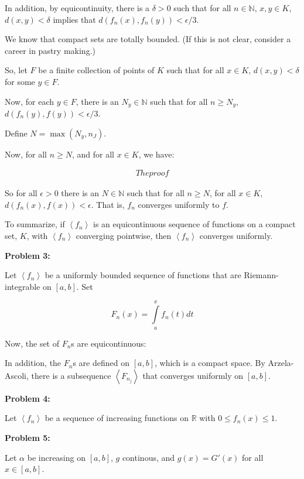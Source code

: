\documentclass[a4paper,12pt]{article}
\newcommand{\tab}{\hspace{4mm}} %
\newcommand{\shunt}{\vspace{20mm}}
\newcommand{\anbrack}[1]{\left\langle #1 \right\rangle}
\newcommand{\al}{\alpha} %
\newcommand{\de}{\delta}
\newcommand{\ep}{\epsilon}
\newcommand{\N}{\mathbb{N}}
\newcommand{\R}{\mathbb{R}}
\begin{document}
\tab In addition, by equicontinuity, there is a $\de >0$ such that for all $n \in \N$, $x,y \in K$, $d(x,y) < \de$ implies that $d(f_n(x),f_n(y)) < \ep/3$.

\tab We know that compact sets are totally bounded. (If this is not clear, consider a career in pastry making.)

\tab So, let $F$ be a finite collection of points of $K$ such that for all $x \in K$, $d(x,y) < \de$ for some $y \in F$.

\tab Now, for each $y \in F$, there is an $N_y \in \N$ such that for all $n \geq N_y$, $d(f_n(y),f(y)) < \ep/3$. 

\tab Define $N = \max(N_y,n_J)$. 

\tab Now, for all $n \geq N$, and for all $x \in K$, we have: %

\begin{align*}
The proof
\end{align*}

So for all $\ep >0$ there is an $N \in \N$ such that for all $n \geq N$, for all $x \in K$, $d(f_n(x),f(x)) < \ep$. That is, $f_n$ converges uniformly to $f$.

To summarize, if $\anbrack{f_n}$ is an equicontinuous sequence of functions on a compact set, $K$, with $\anbrack{f_n}$ converging pointwise, then $\anbrack{f_n}$ converges uniformly.

\shunt

{\bf Problem 3:}

Let $\anbrack{f_n}$ be a uniformly bounded sequence of functions that are Riemann-integrable on $[a,b]$. Set

\begin{displaymath}
F_n(x) = \int\limits_a^x f_n(t)dt
\end{displaymath}

Now, the set of $F_n$s are equicontinuous: %

In addition, the $F_n$s are defined on $[a,b]$, which is a compact space. By Arzela-Ascoli, there is a subsequence $\anbrack{F_{n_j}}$ that converges uniformly on $[a,b]$.
\shunt

{\bf Problem 4:}

Let $\anbrack{f_n}$ be a sequence of increasing functions on $\R$ with $0 \leq f_n(x) \leq 1$. 

\shunt

{\bf Problem 5:}

Let $\al$ be increasing on $[a,b]$, $g$ continous, and $g(x) = G'(x)$ for all $x \in [a,b]$.
\end{document}
